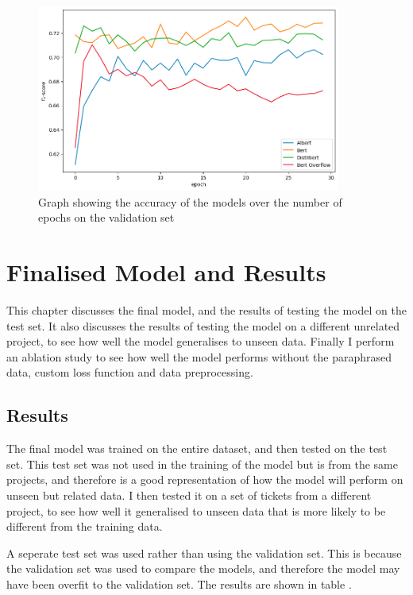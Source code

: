 \documentclass{UoYCSproject}
\begin{document}
\begin{figure}[h]
    \centering

        \includegraphics[width=10cm]{./figures/accurach-epochs}
        \caption{Graph showing the accuracy of the models over the number of epochs on the validation set}
        \label{fig:accuracy-graph}
    \end{figure}

    \chapter{Finalised Model and Results }
    \label{ch:results}

    This chapter discusses the final model, and the results of testing the model on the test set.
    It also discusses the results of testing the model on a different unrelated project, to see how well the model generalises to unseen data.
    Finally I perform an ablation study to see how well the model performs without the paraphrased data, custom loss function and data preprocessing.


    \section{Results}\label{sec:results}
    The final model was trained on the entire dataset, and then tested on the test set.
    This test set was not used in the training of the model but is from the same projects, and therefore is a good representation of how the model will perform on unseen but related data.
    I then tested it on a set of tickets from a different project, to see how well it generalised to unseen data that is more likely to be different from the training data.

    A seperate test set was used rather than using the validation set. This is because the validation set was used to compare the models, and therefore the model may have been overfit to the validation set.
    The results are shown in table .
\end{document}
